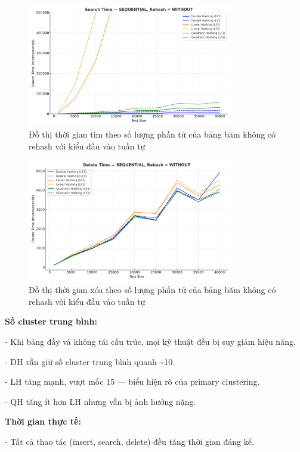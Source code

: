 \documentclass[12pt,a4paper]{report}
\begin{document}
\begin{figure}[!ht]
    \centering
    \includegraphics[width=0.8\textwidth]{seq_sear_not.png}
    \caption{Đồ thị thời gian tìm theo số lượng phần tử của bảng băm không có rehash với kiểu đầu vào tuần tự}
    \label{fig:flowchart}
\end{figure}

\begin{figure}[!ht]
    \centering
    \includegraphics[width=0.8\textwidth]{seq_del_not.png}
    \caption{Đồ thị thời gian xóa theo số lượng phần tử của bảng băm không có rehash với kiểu đầu vào tuần tự}
    \label{fig:flowchart}
\end{figure}

\noindent \indent \textbf{Số cluster trung bình:}

-	Khi bảng đầy và không tái cấu trúc, mọi kỹ thuật đều bị suy giảm hiệu năng.

-	DH vẫn giữ số cluster trung bình quanh \textasciitilde 10.

-	LH tăng mạnh, vượt mốc 15 — biểu hiện rõ của primary clustering.

-	QH tăng ít hơn LH nhưng vẫn bị ảnh hưởng nặng.

\textbf{Thời gian thực tế:}

-	Tất cả thao tác (insert, search, delete) đều tăng thời gian đáng kể.
\end{document}
